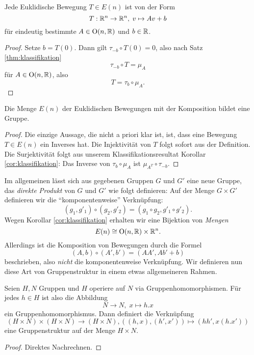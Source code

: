 \documentclass{book}
\begin{document}
\begin{cor}
  \label{cor:klassifikation}
  Jede Euklidische Bewegung $T \in E(n)$ ist von der Form
  \[
      T: \mathbb{R}^n \to \mathbb{R}^n,\; v \mapsto Av+b
  \]
  für eindeutig bestimmte $A \in \operatorname{O}(n,\mathbb{R})$ und $b \in \mathbb{R}$. 
\end{cor}
\begin{proof}
    Setze $b = T(0)$. Dann gilt $\tau_{-b} \circ T (0) = 0$, also nach Satz \ref{thm:klassifikation}
    \[
        \tau_{-b} \circ T = \mu_A
    \]
    für $A \in \operatorname{O}(n,\mathbb{R})$, also 
    \[
        T = \tau_b \circ \mu_A.
    \]
\end{proof}

\begin{cor}
  \label{cor:gruppe}
  Die Menge $E(n)$ der Euklidischen Bewegungen mit der Komposition bildet eine Gruppe. 
\end{cor}
\begin{proof}
    Die einzige Aussage, die nicht a priori klar ist, ist, dass eine Bewegung
    $T \in E(n)$ ein Inverses hat. Die Injektivität von $T$ folgt sofort aus der
    Definition. Die Surjektivität folgt aus unserem Klassifikationsresultat
    Korollar \ref{cor:klassifikation}: Das Inverse von $\tau_b \circ
    \mu_A$ ist $\mu_{A^T} \circ \tau_{-b}$. 
\end{proof}

\begin{rem}
    \label{rem:semi}
    Im allgemeinen lässt sich aus gegebenen Gruppen $G$ und $G'$ eine neue
    Gruppe, das \emph{direkte Produkt} von $G$ und $G'$ wie folgt definieren:
    Auf der Menge $G \times G'$ definieren wir die ``komponentenweise'' Verknüpfung: 
    \[
        (g_1,g'_1) \circ (g_2,g'_2) = (g_1 \circ g_2,g'_1 \circ g'_2).
    \]
    Wegen Korollar \ref{cor:klassifikation} erhalten wir eine Bijektion von \emph{Mengen}
    \[
        E(n) \cong \operatorname{O}(n,\mathbb{R}) \times \mathbb{R}^n.
    \]
    Allerdings ist die Komposition von Bewegungen durch die Formel 
    \[
        (A,b) \circ (A',b') = (AA', Ab' + b)
    \]
    beschrieben, also \emph{nicht} die komponentenweise Verknüpfung. Wir
    definieren nun diese Art von Gruppenstruktur in einem etwas allgemeineren
    Rahmen.
\end{rem}

\begin{prop}
    \label{prop:semidirekt}
    Seien $H,N$ Gruppen und $H$ operiere auf $N$ via Gruppenhomomorphismen. Für jedes $h \in H$ ist also die Abbildung
    \[
        N \to N, \; x \mapsto h.x
    \]
    ein Gruppenhomomorphismus. Dann definiert die Verknüpfung
    \[
        (H \times N) \times (H \times N) \to (H \times N), ((h,x),(h',x')) \mapsto (hh',x(h.x'))
    \]
    eine Gruppenstruktur auf der Menge $H \times N$. 
\end{prop}
\begin{proof}
    Direktes Nachrechnen.
\end{proof}
\end{document}
